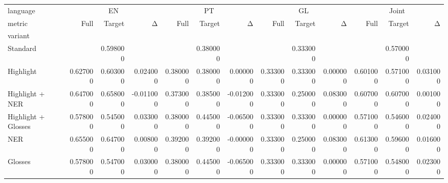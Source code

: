 \begin{tabular}{lrrrrrrrrrrrr}
\toprule
language & \multicolumn{3}{c}{EN} & \multicolumn{3}{c}{PT} & \multicolumn{3}{c}{GL} & \multicolumn{3}{c}{Joint} \\
metric & Full & Target & Δ & Full & Target & Δ & Full & Target & Δ & Full & Target & Δ \\
variant &  &  &  &  &  &  &  &  &  &  &  &  \\
\midrule
Standard &  & 0.598000 &  &  & 0.380000 &  &  & 0.333000 &  &  & 0.570000 &  \\
Highlight & 0.627000 & 0.603000 & 0.024000 & 0.380000 & 0.380000 & 0.000000 & 0.333000 & 0.333000 & 0.000000 & 0.601000 & 0.571000 & 0.031000 \\
Highlight + NER & 0.647000 & 0.658000 & -0.011000 & 0.373000 & 0.385000 & -0.012000 & 0.333000 & 0.250000 & 0.083000 & 0.607000 & 0.607000 & 0.001000 \\
Highlight + Glosses & 0.578000 & 0.545000 & 0.033000 & 0.380000 & 0.445000 & -0.065000 & 0.333000 & 0.333000 & 0.000000 & 0.571000 & 0.546000 & 0.024000 \\
NER & 0.655000 & 0.647000 & 0.008000 & 0.392000 & 0.392000 & -0.000000 & 0.333000 & 0.250000 & 0.083000 & 0.613000 & 0.596000 & 0.016000 \\
Glosses & 0.578000 & 0.547000 & 0.030000 & 0.380000 & 0.445000 & -0.065000 & 0.333000 & 0.333000 & 0.000000 & 0.571000 & 0.548000 & 0.023000 \\
\bottomrule
\end{tabular}
